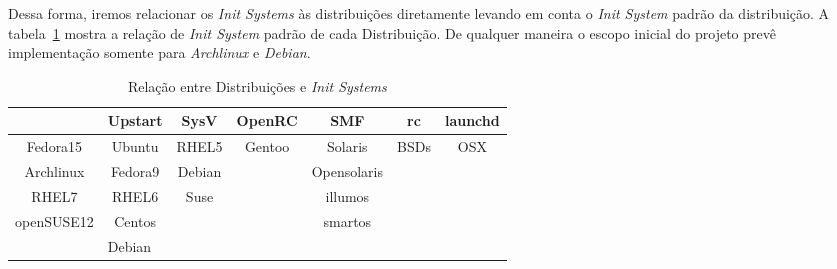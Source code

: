 Dessa forma, iremos relacionar os \textit{Init Systems} às distribuições
diretamente levando em conta o \textit{Init System} padrão da distribuição.
A tabela~\ref{tab:inits-distro} mostra a relação de \textit{Init System} padrão de cada 
Distribuição. De qualquer maneira o escopo inicial do projeto prevê
implementação somente para \textit{Archlinux} e \textit{Debian}.

\begin{table}[H]
\centering
\caption{Relação entre Distribuições e \textit{Init Systems}}
\label{tab:inits-distro}
\begin{tabular}{c|c|ccccc}
\hline
\rowcolor[HTML]{C0C0C0} 
\multicolumn{1}{|c|}{\cellcolor[HTML]{C0C0C0}systemd} & Upstart                     & \multicolumn{1}{c|}{\cellcolor[HTML]{C0C0C0}SysV} & \multicolumn{1}{c|}{\cellcolor[HTML]{C0C0C0}OpenRC} & \multicolumn{1}{c|}{\cellcolor[HTML]{C0C0C0}SMF} & \multicolumn{1}{c|}{\cellcolor[HTML]{C0C0C0}rc} & \multicolumn{1}{c|}{\cellcolor[HTML]{C0C0C0}launchd} \\ \hline
\multicolumn{1}{|c|}{Fedora15}                        & Ubuntu                      & \multicolumn{1}{c|}{RHEL5}                        & \multicolumn{1}{c|}{Gentoo}                         & \multicolumn{1}{c|}{Solaris}                     & \multicolumn{1}{c|}{BSDs}                       & \multicolumn{1}{c|}{OSX}                             \\ \hline
\multicolumn{1}{|c|}{Archlinux}                       & Fedora9                     & \multicolumn{1}{c|}{Debian}                       & \multicolumn{1}{c|}{}                               & \multicolumn{1}{c|}{Opensolaris}                 &                                                 &                                                      \\ \cline{1-3} \cline{5-5}
\multicolumn{1}{|c|}{RHEL7}                           & RHEL6                       & \multicolumn{1}{c|}{Suse}                         & \multicolumn{1}{c|}{}                               & \multicolumn{1}{c|}{illumos}                     &                                                 &                                                      \\ \cline{1-3} \cline{5-5}
\multicolumn{1}{|c|}{openSUSE12}                      & Centos                      &                                                   & \multicolumn{1}{c|}{}                               & \multicolumn{1}{c|}{smartos}                     &                                                 &                                                      \\ \cline{1-2} \cline{5-5}
\multicolumn{1}{l|}{}                                 & \multicolumn{1}{l|}{Debian} & \multicolumn{1}{l}{}                              & \multicolumn{1}{l}{}                                & \multicolumn{1}{l}{}                             & \multicolumn{1}{l}{}                            & \multicolumn{1}{l}{}                                 \\ \cline{2-2}
\end{tabular}
\end{table}

